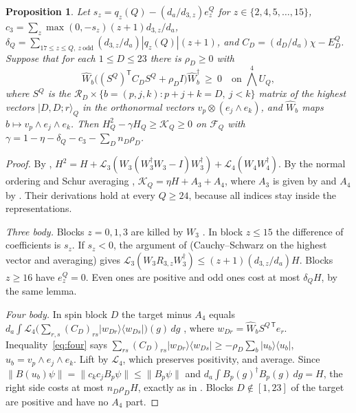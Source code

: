 \documentclass[11pt]{amsart}
\newtheorem{proposition}[theorem]{Proposition}
\theoremstyle{remark}
\newcommand{\FF}{\mathcal F}
\newcommand{\LL}{\mathcal L}
\newcommand{\Wh}{\widehat W}
\begin{document}
\begin{proposition}\label{prop:C}
Let $s_z=q_z(Q)-(d_a/d_{3,z})e^Q_z$ for $z\in\{2,4,5,\dots,15\}$,
$c_3=\sum_z\max(0,-s_z)(z+1)d_{3,z}/d_a$,
$\delta_Q=\sum_{17\le z\le Q,\ z\ \mathrm{odd}}(d_{3,z}/d_a)|q_z(Q)|(z+1)$, and $C_D=(d_D/d_a)\chi-E_D^Q$.
Suppose that for each $1\le D\le23$ there is $\rho_D\ge0$ with
\begin{equation}\label{eq:four}
 \Wh_b\bigl((S^Q)^{\mathsf T}C_DS^Q+\rho_DI\bigr)\Wh_b^{\dagger}\ \ge\ 0\quad\text{on }\textstyle\bigwedge^4U_Q,
\end{equation}
where $S^Q$ is the $\mathcal R_D\times\{b=(p,j,k):p+j+k=D,\ j<k\}$ matrix of the highest vectors
$|D,D;r\rangle_Q$ in the orthonormal vectors $v_p\otimes(e_j\wedge e_k)$, and $\Wh_b$ maps $b\mapsto v_p\wedge e_j\wedge e_k$.
Then $H_Q^2-\gamma H_Q\ge\mathcal K_Q\ge0$ on $\FF_Q$ with
$\gamma=1-\eta-\delta_Q-c_3-\sum_Dn_D\rho_D$.
\end{proposition}
\begin{proof}
By \cite[Lemma~2.1]{OAI}, $H^2=H+\LL_3(W_3(W_3^\dagger W_3-I)W_3^\dagger)+\LL_4(W_4W_4^\dagger)$.
By the normal ordering \cite[(normal2)--(normal4)]{OAI} and Schur averaging \cite[\S4]{OAI},
$\mathcal K_Q=\eta H+A_3+A_4$, where $A_3$ is given by \cite[(A3)]{OAI} and $A_4$ by \cite[(A4)]{OAI}.
Their derivations hold at every $Q\ge24$, because all indices stay inside the representations.

\emph{Three body.} Blocks $z=0,1,3$ are killed by $W_3$ \cite[Lemma~3.2]{OAI}. In block $z\le15$ the
difference of coefficients is $s_z$. If $s_z<0$, the argument of \cite[Lemma~6.1]{OAI}
(Cauchy--Schwarz on the highest vector and averaging) gives
$\LL_3(W_3R_{3,z}W_3^\dagger)\le(z+1)(d_{3,z}/d_a)H$. Blocks $z\ge16$ have $e_z^Q=0$. Even
ones are positive and odd ones cost at most $\delta_QH$, by the same lemma.

\emph{Four body.} In spin block $D$ the target minus $A_4$ equals
$d_a\int\LL_4\bigl(\sum_{r,s}(C_D)_{rs}|w_{Dr}\rangle\langle w_{Ds}|\bigr)(g)\,dg$
\cite[proof of Prop.~5.3]{OAI}, where $w_{Dr}=\Wh_bS^{Q\,\mathsf T}e_r$. Inequality~\eqref{eq:four} says
$\sum_{rs}(C_D)_{rs}|w_{Dr}\rangle\langle w_{Ds}|\ge-\rho_D\sum_b|u_b\rangle\langle u_b|$, $u_b=v_p\wedge e_j\wedge e_k$.
Lift by $\LL_4$, which preserves positivity, and average. Since
$\|B(u_b)\psi\|=\|c_kc_jB_p\psi\|\le\|B_p\psi\|$ and $d_a\int B_p(g)^\dagger B_p(g)\,dg=H$,
the right side costs at most $n_D\rho_DH$, exactly as in \cite[Prop.~5.3]{OAI}. Blocks $D\notin[1,23]$ of the
target are positive and have no $A_4$ part.
\end{proof}
\end{document}
